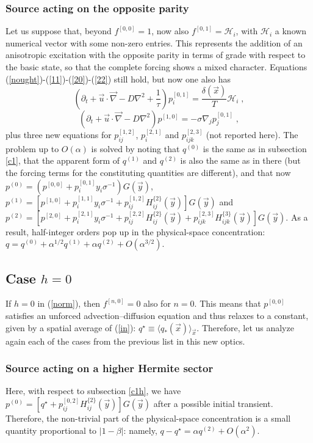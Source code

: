 \subsubsection{Source acting on the opposite parity} \label{c1o}
%
Let us suppose that, beyond $f^{[0,0]}=1$, now also $f^{[0,1]}=\mathcal{H}_i$, with $\mathcal{H}_i$ a known numerical vector with some non-zero entries.
This represents the addition of an anisotropic excitation with the opposite parity in terms of grade with respect to the basic state,
so that the complete forcing shows a mixed character. Equations (\ref{nought})-(\ref{11})-(\ref{20})-(\ref{22}) still hold, but now one also has
\[\left(\partial_t+\vec{u}\cdot\vec{\nabla}-D\nabla^2+\frac{1}{\tau}\right)p^{[0,1]}_i=\frac{\delta(\vec{x})}{T}\mathcal{H}_i\;,\]
\[(\partial_t+\vec{u}\cdot\vec{\nabla}-D\nabla^2)p^{[1,0]}=-\sigma\nabla_jp^{[0,1]}_j\;,\]
plus three new equations for $p^{[1,2]}_{ij}$, $p^{[2,1]}_i$ and $p^{[2,3]}_{ijk}$ (not reported here).
The problem up to $O(\alpha)$ is solved by noting that $q^{(0)}$ is the same as in subsection \ref{c1}, that the apparent form of $q^{(1)}$ and $q^{(2)}$
is also the same as in there (but the forcing terms for the constituting quantities are different), and that now
$p^{(0)}=(p^{[0,0]}+p^{[0,1]}_iy_i\sigma^{-1})G(\vec{y})$, $p^{(1)}=[p^{[1,0]}+p^{[1,1]}_iy_i\sigma^{-1}+p^{[1,2]}_{ij}H^{\{2\}}_{ij}(\vec{y})]G(\vec{y})$
and $p^{(2)}=[p^{[2,0]}+p^{[2,1]}_iy_i\sigma^{-1}+p^{[2,2]}_{ij}H^{\{2\}}_{ij}(\vec{y})+p^{[2,3]}_{ijk}H^{\{3\}}_{ijk}(\vec{y})]G(\vec{y})$.
As a result, half-integer orders pop up in the physical-space concentration: $q=q^{(0)}+\alpha^{1/2}q^{(1)}+\alpha q^{(2)}+O(\alpha^{3/2})$.
%
\subsection{Case $h=0$}
%
If $h=0$ in (\ref{norm}), then $f^{[n,0]}=0$ also for $n=0$. This means that $p^{[0,0]}$ satisfies an unforced advection--diffusion equation
and thus relaxes to a constant, given by a spatial average of (\ref{in}): $q^{\star}\equiv\langle q_*(\vec{x})\rangle_{\vec{x}}$.
Therefore, let us analyze again each of the cases from the previous list in this new optics.
%
\subsubsection{Source acting on a higher Hermite sector}
%
Here, with respect to subsection \ref{c1h}, we have $p^{(0)}=[q^{\star}+p^{[0,2]}_{ij}H^{\{2\}}_{ij}(\vec{y})]G(\vec{y})$
after a possible initial transient. Therefore, the non-trivial part of the physical-space concentration is a small quantity proportional to $|1-\beta|$:
namely, $q-q^{\star}=\alpha q^{(2)}+O(\alpha^2)$.
%
